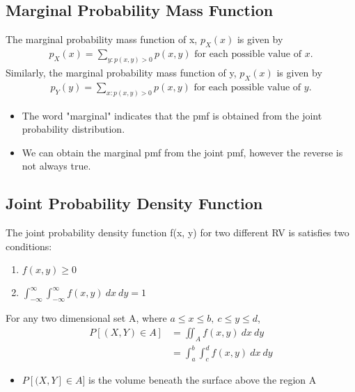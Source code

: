 \documentclass[a4paper]{article}
\begin{document}
\subsection{Marginal Probability Mass Function}
The marginal probability mass function of x, $p_{X}(x)$ is given by
\begin{align*}
    p_{X}(x) = \sum\limits_{y: p(x, y)> 0} p(x, y)\text{ for each possible value of }x.
\end{align*}
Similarly, the marginal probability mass function of y, $p_{X}(x)$ is given by
\begin{align*}
    p_{Y}(y) = \sum\limits_{x: p(x, y)> 0} p(x, y)\text{ for each possible value of }y.
\end{align*}
\begin{itemize}
    \item The word "marginal" indicates that the pmf is obtained from the joint probability distribution.
    \item We can obtain the marginal pmf from the joint pmf, however the reverse is not always true.
\end{itemize} 
\subsection{Joint Probability Density Function}
The joint probability density function f(x, y) for two different RV is satisfies two conditions:
\begin{enumerate}
    \item $f(x, y) \geq 0$ 
    \item $\int_{-\infty}^{\infty}\int_{-\infty}^{\infty}f(x, y) \ dx \ dy = 1$
\end{enumerate}
For any two dimensional set A, where $a \leq x \leq b,\  c \leq y \leq d$,
\begin{align*}
    P[(X, Y) \in A] &= \iint_{A}f(x, y) \ dx \ dy\\
    &= \int_{a}^{b}\int_{c}^{d}f(x, y) \ dx \ dy
\end{align*}
\begin{itemize}
    \item $P[(X, Y] \in A]$ is the volume beneath the surface above the region A
\end{itemize}
\end{document}
